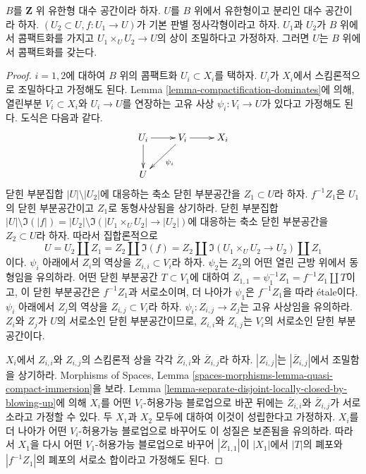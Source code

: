 \begin{lemma}
\label{lemma-two-compactifications}
$B$를 $\mathbf{Z}$ 위 유한형 대수 공간이라 하자.
$U$를 $B$ 위에서 유한형이고 분리인 대수 공간이라 하자.
$(U_2 \subset U, f : U_1 \to U)$가 기본 판별 정사각형이라고 하자.
$U_1$과 $U_2$가 $B$ 위에서 콤팩트화를 가지고
$U_1 \times_U U_2 \to U$의 상이 조밀하다고 가정하자.
그러면 $U$는 $B$ 위에서 콤팩트화를 갖는다.
\end{lemma}

\begin{proof}
$i = 1, 2$에 대하여 $B$ 위의 콤팩트화 $U_i \subset X_i$를 택하자.
$U_i$가 $X_i$에서 스킴론적으로 조밀하다고 가정해도 된다.
Lemma \ref{lemma-compactification-dominates}에 의해, 열린부분
$V_i \subset X_i$와 $U_i \to U$를 연장하는 고유 사상
$\psi_i : V_i \to U$가 있다고 가정해도 된다. 도식은 다음과 같다.
$$
\xymatrix{
U_i \ar[r] \ar[d] & V_i \ar[r] \ar[dl]^{\psi_i} & X_i \\
U
}
$$
닫힌 부분집합 $|U| \setminus |U_2|$에 대응하는 축소 닫힌
부분공간을 $Z_1 \subset U$라 하자. $f^{-1}Z_1$은 $U_1$의 닫힌
부분공간이고 $Z_1$로 동형사상됨을 상기하라.
닫힌 부분집합
$|U| \setminus \Im(|f|) =
|U_2| \setminus \Im(|U_1 \times_U U_2| \to |U_2|)$에 대응하는 축소
닫힌 부분공간을 $Z_2 \subset U$라 하자. 따라서 집합론적으로
$$
U = U_2 \amalg Z_1 = Z_2 \amalg \Im(f) =
Z_2 \amalg \Im(U_1 \times_U U_2 \to U_2) \amalg Z_1
$$
이다. $\psi_i$ 아래에서 $Z_i$의 역상을
$Z_{i, i} \subset V_i$라 하자. $\psi_2$는 $Z_2$의 어떤 열린 근방
위에서 동형임을 유의하라. 어떤 닫힌 부분공간
$T \subset V_1$에 대하여
$Z_{1, 1} = \psi_1^{-1}Z_1 = f^{-1}Z_1 \amalg T$이고,
이 닫힌 부분공간은 $f^{-1}Z_1$과 서로소이며, 더 나아가 $\psi_1$은
$f^{-1}Z_1$을 따라 \'etale이다.
$\psi_i$ 아래에서 $Z_j$의 역상을 $Z_{i, j} \subset V_i$라 하자.
$\psi_i : Z_{i, j} \to Z_j$는 고유 사상임을 유의하라.
$Z_i$와 $Z_j$가 $U$의 서로소인 닫힌 부분공간이므로,
$Z_{i, i}$와 $Z_{i, j}$는 $V_i$의 서로소인 닫힌 부분공간이다.

\medskip\noindent
$X_i$에서 $Z_{i, i}$와 $Z_{i, j}$의 스킴론적 상을 각각
$\overline{Z}_{i, i}$와 $\overline{Z}_{i, j}$라 하자.
$|Z_{i, j}|$는 $|\overline{Z}_{i, j}|$에서 조밀함을 상기하라.
Morphisms of Spaces, Lemma
\ref{spaces-morphisms-lemma-quasi-compact-immersion}을 보라.
Lemma \ref{lemma-separate-disjoint-locally-closed-by-blowing-up}에 의해
$X_i$를 어떤 $V_i$-허용가능 블로업으로 바꾼 뒤에는
$\overline{Z}_{i, i}$와 $\overline{Z}_{i, j}$가 서로소라고 가정할 수
있다. 두 $X_1$과 $X_2$ 모두에 대하여 이것이 성립한다고 가정하자.
$X_i$를 더 나아가 어떤 $V_i$-허용가능 블로업으로 바꾸어도 이 성질은
보존됨을 유의하라. 따라서 $X_1$을 다시 어떤 $V_1$-허용가능
블로업으로 바꾸어 $|\overline{Z}_{1, 1}|$이 $|X_1|$에서
$|T|$의 폐포와 $|f^{-1}Z_1|$의 폐포의 서로소 합이라고 가정해도 된다.


\end{proof}
